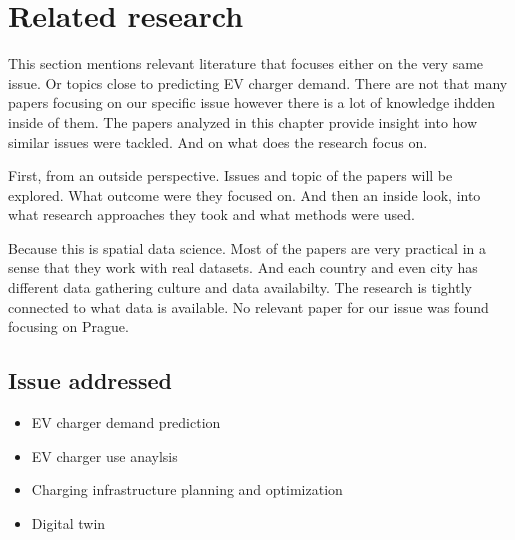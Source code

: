 \setchapterpreamble[u]{\margintoc}
\chapter{Related research}


This section mentions relevant literature that focuses either on the very same issue. Or topics close to predicting EV charger demand. There are not that many papers focusing on our specific issue however there is a lot of knowledge ihdden inside of them. The papers analyzed in this chapter provide insight into how similar issues were tackled. And on what does the research focus on.


First, from an outside perspective. Issues and topic of the papers will be explored. What outcome were they focused on. And then an inside look, into what research approaches they took and what methods were used.

Because this is spatial data science. Most of the papers are very practical in a sense that they work with real datasets. And each country and even city has different data gathering culture and data availabilty. The research is tightly connected to what data is available. No relevant paper for our issue was found focusing on Prague.



\section{Issue addressed}


\begin{itemize}
    \item EV charger demand prediction
    \item EV charger use anaylsis 
    \item Charging infrastructure planning and optimization
    \item Digital twin
\end{itemize}

